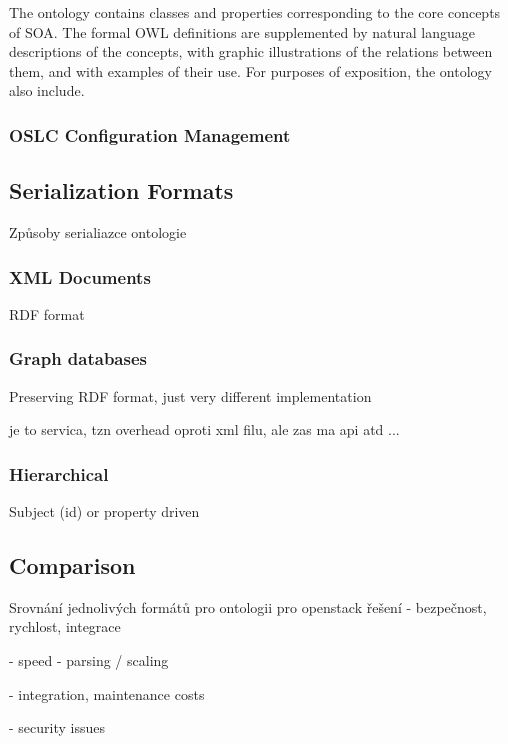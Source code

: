 The ontology contains classes and properties corresponding to the core concepts of SOA. The formal OWL definitions are supplemented by natural language descriptions of the concepts, with graphic illustrations of the relations between them, and with examples of their use. For purposes of exposition, the ontology also include.

\subsubsection{OSLC Configuration Management}



\subsection{Serialization Formats}

Způsoby serialiazce ontologie

\subsubsection{XML Documents}

RDF format

\subsubsection{Graph databases}

Preserving RDF format, just very different implementation 

je to servica, tzn overhead oproti xml filu, ale zas ma api atd ...

\subsubsection{Hierarchical}

Subject (id) or property driven

\subsection{Comparison}

Srovnání jednolivých formátů pro ontologii pro openstack řešení - bezpečnost, rychlost, integrace

- speed - parsing / scaling

- integration, maintenance costs

- security issues
